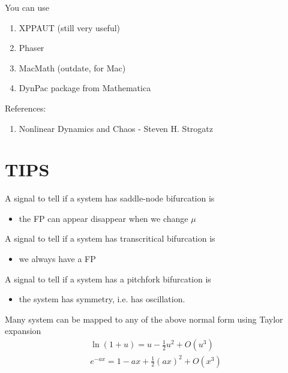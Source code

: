 You can use
\begin{enumerate}
\item XPPAUT (still very useful)
\item Phaser
\item MacMath (outdate, for Mac)
\item DynPac package from Mathematica
\end{enumerate}

References:
\begin{enumerate}
\item Nonlinear Dynamics and Chaos - Steven H. Strogatz
\end{enumerate}

\section{TIPS}
\label{sec:tips}

A signal to tell if a system has saddle-node bifurcation is 
\begin{itemize}
\item the FP can appear disappear when we change $\mu$
\end{itemize}

A signal to tell if a system has transcritical bifurcation is
\begin{itemize}
\item we always have a FP
\end{itemize}

A signal to tell if a system has a pitchfork bifurcation is
\begin{itemize}
\item the system has symmetry, i.e. has oscillation.
\end{itemize}


Many system can be mapped to any of the above normal form using Taylor
expansion
\begin{equation}
  \label{eq:683}
  \begin{split}
    \ln(1+u) = u - \frac{1}{2}u^2 + O(u^3) \\
    e^{-ax} = 1 - ax + \frac{1}{2} (ax)^2 + O(x^3)
  \end{split}
\end{equation}

